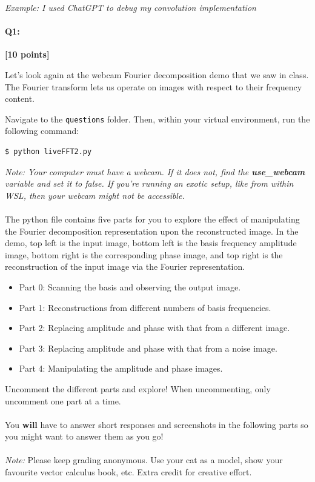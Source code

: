 \documentclass[11pt]{article}
\begin{document}
\textit{Example: I used ChatGPT to debug my convolution implementation}


\pagebreak


\paragraph{Q1:} \textbf{[10 points]} 

Let's look again at the webcam Fourier decomposition demo that we saw in class. The Fourier transform lets us operate on images with respect to their frequency content. 

\begin{tcolorbox}[colback=orange!5!white,colframe=orange!75!black]
Navigate to the \texttt{questions} folder. Then, within your virtual environment, run the following command:
\begin{verbatim}
$ python liveFFT2.py
\end{verbatim}

\emph{Note: Your computer must have a webcam. If it does not, find the \textbf{use\_webcam} variable and set it to false. If you're running an exotic setup, like from within WSL, then your webcam might not be accessible.}
\\
\\
The python file contains five parts for you to explore the effect of manipulating the Fourier decomposition representation upon the reconstructed image. In the demo, top left is the input image, bottom left is the basis frequency amplitude image, bottom right is the corresponding phase image, and top right is the reconstruction of the input image via the Fourier representation.

\begin{itemize}
    \item Part 0: Scanning the basis and observing the output image.
    \item Part 1: Reconstructions from different numbers of basis frequencies.
    \item Part 2: Replacing amplitude and phase with that from a different image.
    \item Part 3: Replacing amplitude and phase with that from a noise image.
    \item Part 4: Manipulating the amplitude and phase images.
\end{itemize}

Uncomment the different parts and explore!  When uncommenting, only uncomment one part at a time.
\\
\\
You \textbf{will} have to answer short responses and screenshots in the following parts so you might want to answer them as you go!
\\
\\
\emph{Note:} Please keep grading anonymous. Use your cat as a model, show your favourite vector calculus book, etc. Extra credit for creative effort.
\end{tcolorbox}
\newpage
\end{document}
